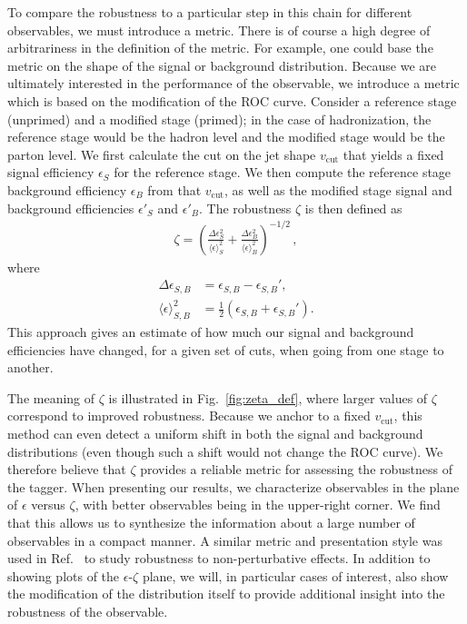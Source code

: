 \documentclass[11pt,letterpaper]{article}
\DeclareRobustCommand{\Fig}[1]{Fig.~\ref{#1}}
\DeclareRobustCommand{\Ref}[1]{Ref.~\cite{#1}}
\begin{document}
To compare the robustness to a
particular step in this chain for different observables, we must
introduce a metric.
%
There is of course a high degree of arbitrariness
in the definition of the metric.
%
For example, one could base the metric on the shape of the signal or background distribution.
%
Because we are ultimately interested in the performance of the observable, we introduce a metric which is based on the modification of the ROC curve.
%
Consider a reference stage (unprimed) and a modified stage (primed); in the case of hadronization, the reference stage would be the hadron level and the modified stage would be the parton level.
%
We first calculate the cut on the jet shape $v_{\text{cut}}$ that yields a fixed signal efficiency $\epsilon_S$ for the reference stage.
%
We then compute the reference stage background efficiency $\epsilon_B$ from that $v_{\text{cut}}$, as well as the modified stage signal and background efficiencies $\epsilon'_S$ and $\epsilon'_B$.
%
The robustness $\zeta$ is then defined as
%
\begin{align}
\zeta=\left(  \frac{\Delta \epsilon_S^2}{ \langle \epsilon \rangle_S^2}  +\frac{\Delta \epsilon_B^2}{ \langle \epsilon \rangle_B^2}  \right)^{-1/2}\,,
\end{align}
%
where
%
\begin{align}
\Delta \epsilon_{S,B} & =\epsilon_{S,B}-\epsilon_{S,B}',\\
\langle \epsilon \rangle_{S,B}^2 & = \frac{1}{2} \left(\epsilon_{S,B} + \epsilon_{S,B}'\right).
\end{align}
%
This approach gives an estimate of how much our signal and background efficiencies have changed, for a given set of cuts, when going from one stage to another.

The meaning of $\zeta$ is illustrated in \Fig{fig:zeta_def}, where larger values of $\zeta$ correspond to improved robustness.
%
Because we anchor to a fixed $v_{\text{cut}}$, this method can even detect a uniform shift in both the signal and background distributions (even though such a shift would not change the ROC curve).
%
We therefore believe that $\zeta$ provides a reliable metric for assessing the robustness of the tagger.
%
When presenting our results, we characterize observables
in the plane of $\epsilon$ versus $\zeta$, with better observables being in
the upper-right corner.
%
We find that this allows us to synthesize the
information about a large number of observables in a compact manner.
%
A
similar metric and presentation style was used in \Ref{Salam:2016yht}
to study robustness to non-perturbative effects.
%
In addition to
showing plots of the $\epsilon$-$\zeta$ plane, we will, in particular
cases of interest, also show the modification of the distribution
itself to provide additional insight into the robustness of the
observable.
\end{document}
